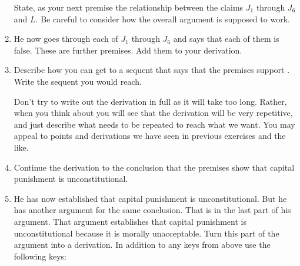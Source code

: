 \begin{enumerate}[leftmargin=*]

 State, as your next premise  the relationship between the claims $J_1$ through 
 $J_6$ and $L$. Be careful to consider how the overall argument is supposed to 
 work.


\item He now goes through each of $J_1$ through $J_6$ and says that each of them 
 is false.  These are further premises.  Add them to your derivation.

 
\item Describe how you can get to a sequent that says that the premises support 
 . Write the sequent you would reach.
 
 Don't try to write out the derivation in full as it will take too long. Rather, 
 when you think about you will see that the derivation will be very repetitive, 
 and just describe what needs to be repeated to reach what we want. You may 
 appeal to points and derivations we have seen in previous exercises and the 
 like.
 
\item Continue the derivation to the conclusion that the premises show that 
 capital punishment is unconstitutional.
 
\item He has now established that capital punishment is unconstitutional. But he 
 has another argument for the same conclusion. That is in the last part of his 
 argument. That argument establishes that capital punishment is unconstitutional 
 because it is morally unacceptable. Turn this part of the argument into a 
 derivation. In addition to any keys from above use the following keys:

 \end{enumerate}

